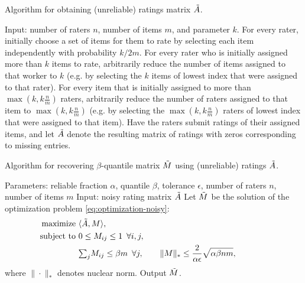 \begin{algorithm}[b!]
\caption{Algorithm for obtaining (unreliable) ratings matrix $\tilde{A}$.}
\label{alg:create-A}
\begin{algorithmic}[1]
\State Input: number of raters $n$,  number of items $m$, and parameter $k$.
\State For every rater, initially choose a set of items for them to rate by selecting each item independently with probability $k/2m$.  
\State For every rater who is initially assigned more than $k$ items to rate, arbitrarily reduce the number of items assigned to that worker to $k$ (e.g. by selecting the $k$ items of lowest index that were assigned to that rater).
\State For every item that is initially assigned to more than $\max\left(k,k\frac{n}{m}\right)$ raters, arbitrarily reduce the number of raters assigned to that item to $\max\left(k, k \frac{n}{m}\right)$ (e.g. by selecting the $\max \left(k, k \frac{n}{m}\right)$ raters of lowest index that were assigned to that item).
\State Have the raters submit ratings of their assigned items, and let $\tilde{A}$ denote the resulting matrix of ratings with zeros corresponding to missing entries.
\end{algorithmic}
\end{algorithm}


\begin{algorithm}[b!]
\caption{Algorithm for recovering $\beta$-quantile matrix $\tilde{M}$ using
(unreliable) ratings $\tilde{A}$.}
\label{alg:recover-M}
\begin{algorithmic}[1]
\State Parameters: reliable fraction $\alpha$, quantile $\beta$, tolerance $\epsilon$, number of raters $n$, number of items $m$
\State Input: noisy rating matrix $\tilde{A}$
\State Let $\tilde{M}$ be the solution of the optimization problem \eqref{eq:optimization-noisy}:
  \begin{align}
  \label{eq:optimization-noisy}
  \text{maximize } &\langle \tilde{A}, M \rangle, \\
  \notag \text{ subject to } &0 \leq M_{ij} \leq 1 \,\,\, \forall i,j, \\
  \notag                     &{\textstyle \sum_{j}} M_{ij} \leq \beta m \,\,\, \forall j, \quad\quad
                      \|M\|_* \leq \frac{2}{\alpha\epsilon}\sqrt{\alpha\beta nm}, \phantom{xxxxxxx}
  \end{align}
  where $\|\cdot\|_*$ denotes nuclear norm.
\State Output $\tilde{M}$.
\end{algorithmic}
\end{algorithm}

